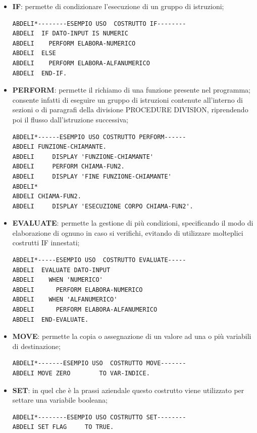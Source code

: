 \begin{itemize}
	\item \textbf{IF}: permette di condizionare l'esecuzione di un gruppo di istruzioni;
	\begin{lstlisting}[language=cobol]
ABDELI*--------ESEMPIO USO  COSTRUTTO IF--------
ABDELI 	IF DATO-INPUT IS NUMERIC
ABDELI 	  PERFORM ELABORA-NUMERICO
ABDELI	ELSE
ABDELI	  PERFORM ELABORA-ALFANUMERICO
ABDELI	END-IF.
	\end{lstlisting}
	
	\item \textbf{PERFORM}: permette il richiamo di una funzione presente nel programma; consente infatti di eseguire un gruppo di istruzioni contenute all’interno di sezioni o di paragrafi della divisione PROCEDURE DIVISION, riprendendo poi il flusso dall'istruzione successiva;
	\begin{lstlisting}[language=cobol]
ABDELI*------ESEMPIO USO COSTRUTTO PERFORM------
ABDELI FUNZIONE-CHIAMANTE.
ABDELI     DISPLAY 'FUNZIONE-CHIAMANTE'
ABDELI 	   PERFORM CHIAMA-FUN2.
ABDELI     DISPLAY 'FINE FUNZIONE-CHIAMANTE'
ABDELI*
ABDELI CHIAMA-FUN2.
ABDELI     DISPLAY 'ESECUZIONE CORPO CHIAMA-FUN2'.
	\end{lstlisting}

	\item \textbf{EVALUATE}: permette la gestione di più condizioni, specificando il modo di elaborazione di ognuno in caso si verifichi, evitando di utilizzare molteplici costrutti IF innestati;
	\begin{lstlisting}[language=cobol]
ABDELI*-----ESEMPIO USO  COSTRUTTO EVALUATE-----
ABDELI 	EVALUATE DATO-INPUT
ABDELI	  WHEN 'NUMERICO'
ABDELI 	    PERFORM ELABORA-NUMERICO
ABDELI	  WHEN 'ALFANUMERICO'
ABDELI	    PERFORM ELABORA-ALFANUMERICO
ABDELI	END-EVALUATE.
	\end{lstlisting}

	\item \textbf{MOVE}: permette la copia o assegnazione di un valore ad una o più variabili di destinazione;
	\begin{lstlisting}[language=cobol]
ABDELI*-------ESEMPIO USO  COSTRUTTO MOVE-------
ABDELI MOVE ZERO		TO VAR-INDICE.
	\end{lstlisting}

	\item \textbf{SET}: in quel che è la prassi aziendale questo costrutto viene utilizzato per settare una variabile booleana;
	\begin{lstlisting}[language=cobol]
ABDELI*--------ESEMPIO USO COSTRUTTO SET--------
ABDELI SET FLAG		TO TRUE.
	\end{lstlisting}


\end{itemize}
